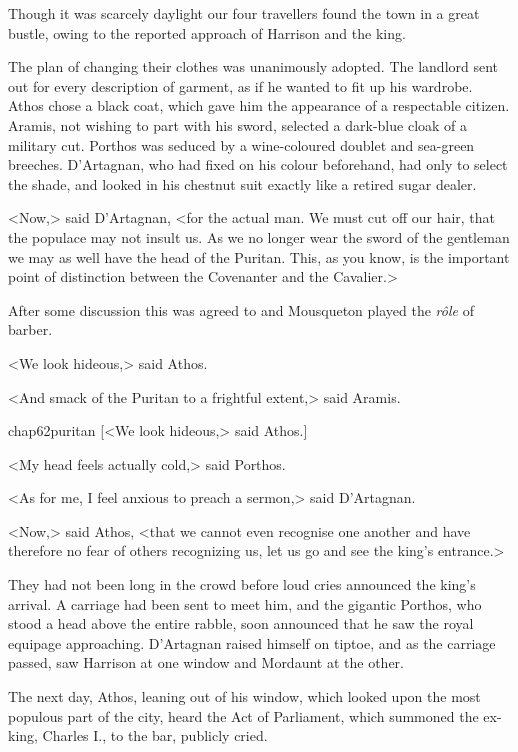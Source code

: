Though it was scarcely daylight our four travellers found the town in a great bustle, owing to the reported approach of Harrison and the king.

The plan of changing their clothes was unanimously adopted. The landlord sent out for every description of garment, as if he wanted to fit up his wardrobe. Athos chose a black coat, which gave him the appearance of a respectable citizen. Aramis, not wishing to part with his sword, selected a dark-blue cloak of a military cut. Porthos was seduced by a wine-coloured doublet and sea-green breeches. D'Artagnan, who had fixed on his colour beforehand, had only to select the shade, and looked in his chestnut suit exactly like a retired sugar dealer.

<Now,> said D'Artagnan, <for the actual man. We must cut off our hair, that the populace may not insult us. As we no longer wear the sword of the gentleman we may as well have the head of the Puritan. This, as you know, is the important point of distinction between the Covenanter and the Cavalier.>

After some discussion this was agreed to and Mousqueton played the \textit{rôle} of barber.

<We look hideous,> said Athos.

<And smack of the Puritan to a frightful extent,> said Aramis.

\begin{bwbigpic}
	[\basicscale] 
	{chap62puritan}
	[<We look hideous,> said Athos.]
\end{bwbigpic}

<My head feels actually cold,> said Porthos.

<As for me, I feel anxious to preach a sermon,> said D'Artagnan.

<Now,> said Athos, <that we cannot even recognise one another and have therefore no fear of others recognizing us, let us go and see the king's entrance.>

They had not been long in the crowd before loud cries announced the king's arrival. A carriage had been sent to meet him, and the gigantic Porthos, who stood a head above the entire rabble, soon announced that he saw the royal equipage approaching. D'Artagnan raised himself on tiptoe, and as the carriage passed, saw Harrison at one window and Mordaunt at the other.

The next day, Athos, leaning out of his window, which looked upon the most populous part of the city, heard the Act of Parliament, which summoned the ex-king, Charles I., to the bar, publicly cried.

